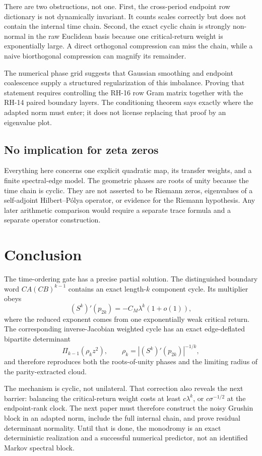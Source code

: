 \documentclass[11pt]{article}
\theoremstyle{definition}
\theoremstyle{remark}
\begin{document}
There are two obstructions, not one.  First, the cross-period endpoint row
dictionary is not dynamically invariant.  It counts scales correctly but
does not contain the internal time chain.  Second, the exact cyclic chain is
strongly non-normal in the raw Euclidean basis because one critical-return
weight is exponentially large.  A direct orthogonal compression can miss the
chain, while a naive biorthogonal compression can magnify its remainder.

The numerical phase grid suggests that Gaussian smoothing and endpoint
coalescence supply a structured regularization of this imbalance.  Proving
that statement requires controlling the RH-16 row Gram matrix together with
the RH-14 paired boundary layers.  The conditioning theorem says exactly
where the adapted norm must enter; it does not license replacing that proof
by an eigenvalue plot.

\subsection{No implication for zeta zeros}

Everything here concerns one explicit quadratic map, its transfer weights,
and a finite spectral-edge model.  The geometric phases are roots of unity
because the time chain is cyclic.  They are not asserted to be Riemann zeros,
eigenvalues of a self-adjoint Hilbert--P\'olya operator, or evidence for the
Riemann hypothesis.  Any later arithmetic comparison would require a
separate trace formula and a separate operator construction.

\section{Conclusion}

The time-ordering gate has a precise partial solution.  The distinguished
boundary word $CA(CB)^{k-1}$ contains an exact length-$k$ component cycle.
Its multiplier obeys
\[
 (S^k)'(p_{2k})=-C_M\lambda^k(1+o(1)),
\]
where the reduced exponent comes from one exponentially weak critical
return.  The corresponding inverse-Jacobian weighted cycle has an exact
edge-deflated bipartite determinant
\[
 \Pi_{k-1}(\rho_kz^2),
 \qquad \rho_k=|(S^k)'(p_{2k})|^{-1/k},
\]
and therefore reproduces both the roots-of-unity phases and the limiting
radius of the parity-extracted cloud.

The mechanism is cyclic, not unilateral.  That correction also reveals the
next barrier: balancing the critical-return weight costs at least
$c\lambda^k$, or $c\sigma^{-1/2}$ at the endpoint-rank clock.  The next paper
must therefore construct the noisy Grushin block in an adapted norm, include
the full internal chain, and prove residual determinant normality.  Until
that is done, the monodromy is an exact deterministic realization and a
successful numerical predictor, not an identified Markov spectral block.
\end{document}
